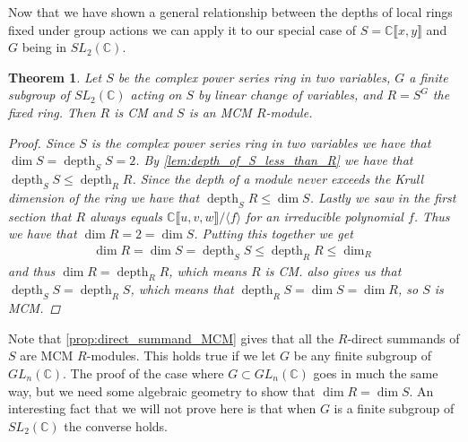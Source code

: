 \documentclass[11pt, a4paper, english]{article}
\newtheorem{theorem}{Theorem}[section]
\theoremstyle{definition}
\newcommand{\C}{\mathbb{C}}
\DeclareMathOperator{\depth}{depth}
\begin{document}
Now that we have shown a general relationship between the depths of local rings fixed under group actions we can apply it to our special case of $S = \C\llbracket x, y \rrbracket$ and $G$ being in $SL_2(\C)$.

\begin{theorem}
\label{thm:S_MCM}
Let $S$ be the complex power series ring in two variables, $G$ a finite subgroup of $SL_2(\C)$ acting on $S$ by linear change of variables, and $R=S^G$ the fixed ring. Then $R$ is CM and $S$ is an MCM $R$-module.
\begin{proof}
Since $S$ is the complex power series ring in two variables we have that $\dim S = \depth_SS=2$. By \cref{lem:depth_of_S_less_than_R} we have that $\depth_SS \leq \depth_RR$. Since the depth of a module never exceeds the Krull dimension of the ring we have that $\depth_SR \leq \dim S$. Lastly we saw in the first section that $R$ always equals $\C\llbracket u, v, w \rrbracket/\langle f \rangle$ for an irreducible polynomial $f$. Thus we have that $\dim R = 2 = \dim S$. Putting this together we get
\begin{align*}
\dim R = \dim S = \depth_SS \leq \depth_RR \leq \dim_R
\end{align*}
and thus $\dim R = \depth_RR$, which means $R$ is CM.  also gives us that $\depth_SS = \depth_RS$, which means that $\depth_RS = \dim S = \dim R$, so $S$ is MCM.
\end{proof}
\end{theorem}

Note that \cref{prop:direct_summand_MCM} gives that all the $R$-direct summands of $S$ are MCM $R$-modules. This holds true if we let $G$ be any finite subgroup of $GL_n(\C)$. The proof of the case where $G \subset GL_n(\C)$ goes in much the same way, but we need some algebraic geometry to show that $\dim R = \dim S$. An interesting fact that we will not prove here is that when $G$ is a finite subgroup of $SL_2(\C)$ the converse holds. 
\end{document}
